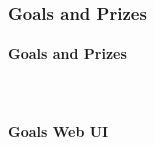 \subsubsection{Goals and Prizes}
\paragraph{Goals and Prizes}\mbox{}\\

\paragraph{Goals Web UI}\mbox{}\\

